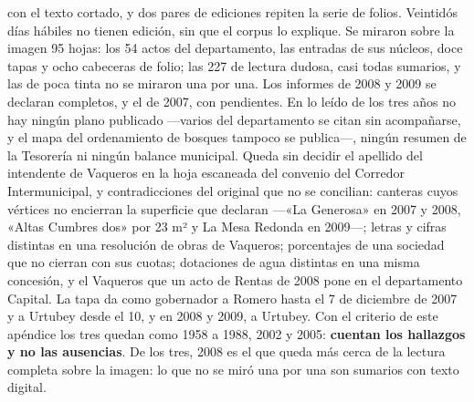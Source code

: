 con el texto cortado, y dos pares de ediciones repiten la serie de folios. Veintidós días hábiles no tienen edición, sin que el corpus lo explique. Se miraron sobre la imagen 95 hojas: los 54 actos del departamento, las entradas de sus núcleos, doce tapas y ocho cabeceras de folio; las 227 de lectura dudosa, casi todas sumarios, y las de poca tinta no se miraron una por una. Los informes de 2008 y 2009 se declaran completos, y el de 2007, con pendientes. En lo leído de los tres años no hay ningún plano publicado ---varios del departamento se citan sin acompañarse, y el mapa del ordenamiento de bosques tampoco se publica---, ningún resumen de la Tesorería ni ningún balance municipal. Queda sin decidir el apellido del intendente de Vaqueros en la hoja escaneada del convenio del Corredor Intermunicipal, y contradicciones del original que no se concilian: canteras cuyos vértices no encierran la superficie que declaran ---«La Generosa» en 2007 y 2008, «Altas Cumbres dos» por 23 m² y La Mesa Redonda en 2009---; letras y cifras distintas en una resolución de obras de Vaqueros; porcentajes de una sociedad que no cierran con sus cuotas; dotaciones de agua distintas en una misma concesión, y el Vaqueros que un acto de Rentas de 2008 pone en el departamento Capital. La tapa da como gobernador a Romero hasta el 7 de diciembre de 2007 y a Urtubey desde el 10, y en 2008 y 2009, a Urtubey. Con el criterio de este apéndice los tres quedan como 1958 a 1988, 2002 y 2005: \textbf{cuentan los hallazgos y no las ausencias}. De los tres, 2008 es el que queda más cerca de la lectura completa sobre la imagen: lo que no se miró una por una son sumarios con texto digital.

